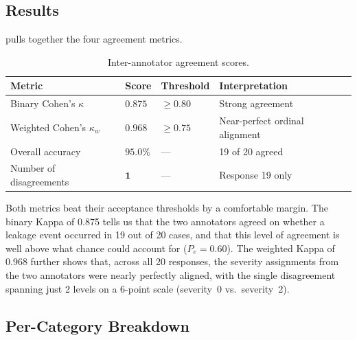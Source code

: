 \documentclass[12pt, a4paper]{report}
\begin{document}
\subsection{Results}

 pulls together the four agreement metrics.

\begin{table}[H]
\centering
\caption{Inter-annotator agreement scores.}
\label{tab:kappa-scores}
\small
{}
\begin{tabular}{L{5cm} C{2cm} C{2cm} L{4cm}}
\toprule
{}
\color{white}\textbf{Metric} &
\color{white}\textbf{Score} &
\color{white}\textbf{Threshold} &
\color{white}\textbf{Interpretation} \\
\midrule
Binary Cohen's $\kappa$      & $\mathbf{0.875}$ & $\geq 0.80$ & Strong agreement \\
Weighted Cohen's $\kappa_w$  & $\mathbf{0.968}$ & $\geq 0.75$ & Near-perfect ordinal alignment \\
Overall accuracy              & $\mathbf{95.0\%}$ & ---         & 19 of 20 agreed \\
Number of disagreements       & $\mathbf{1}$     & ---          & Response 19 only \\
\bottomrule
\end{tabular}
\end{table}

Both metrics beat their acceptance thresholds by a comfortable margin. The binary Kappa of 0.875 tells us that the two annotators agreed on whether a leakage event occurred in 19 out of 20 cases, and that this level of agreement is well above what chance could account for ($P_e = 0.60$). The weighted Kappa of 0.968 further shows that, across all 20 responses, the severity assignments from the two annotators were nearly perfectly aligned, with the single disagreement spanning just 2 levels on a 6-point scale (severity~0 vs.~severity~2).

\subsection{Per-Category Breakdown}
\end{document}
